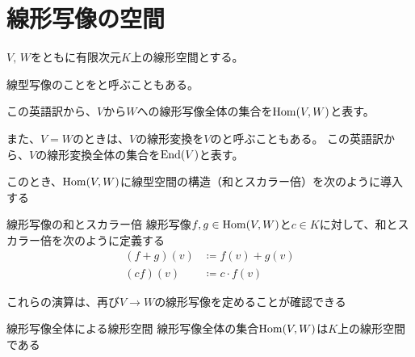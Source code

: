 \documentclass[../../../topic_linear-algebra]{subfiles}
\begin{document}
\sectionline
\section{線形写像の空間}

$V,\,W$をともに有限次元$K$上の線形空間とする。

\br

線型写像のことをと呼ぶこともある。

この英語訳から、$V$から$W$への線形写像全体の集合を$\operatorname{Hom}(V,W)$と表す。

\br

また、$V=W$のときは、$V$の線形変換を$V$のと呼ぶこともある。
この英語訳から、$V$の線形変換全体の集合を$\operatorname{End}(V)$と表す。

\br

このとき、$\operatorname{Hom}(V,W)$に線型空間の構造（和とスカラー倍）を次のように導入する

\begin{definition}{線形写像の和とスカラー倍}\label{def:linear-map-addition-scalar}
  線形写像$f,g\in\operatorname{Hom}(V,W)$と$c\in K$に対して、和とスカラー倍を次のように定義する
  \begin{align*}
    (f+g)(v) & \coloneq f(v) + g(v) \\
    (cf)(v)  & \coloneq c\cdot f(v)
  \end{align*}
\end{definition}

\br

これらの演算は、再び$V \to W$の線形写像を定めることが確認できる

\begin{theorem}{線形写像全体による線形空間}\label{thm:hom-space}
  線形写像全体の集合$\operatorname{Hom}(V,W)$は$K$上の線形空間である
\end{theorem}
\end{document}
